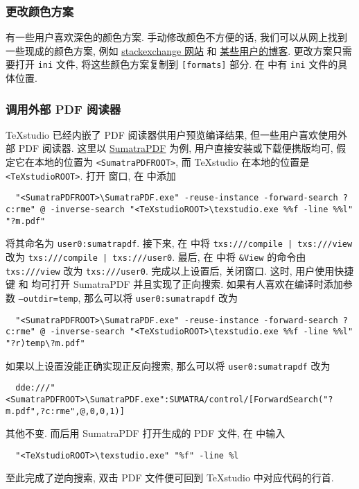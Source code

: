 \subsubsection{更改颜色方案}

有一些用户喜欢深色的颜色方案.
手动修改颜色不方便的话, 我们可以从网上找到一些现成的颜色方案,
例如
\href{https://tex.stackexchange.com/questions/108315/how-can-i-set-a-dark-theme-in-texstudio}{stackexchange 网站}%
和%
\href{https://robjhyndman.com/hyndsight/dark-themes-for-writing/}{某些用户的博客}.
更改方案只需要打开 \texttt{ini} 文件,
将这些颜色方案复制到 \texttt{[formats]} 部分.
在 
中有 \texttt{ini} 文件的具体位置.

\subsubsection{调用外部 PDF 阅读器}

\TeX studio 已经内嵌了 PDF 阅读器供用户预览编译结果,
但一些用户喜欢使用外部 PDF 阅读器.
这里以 \href{https://www.sumatrapdfreader.org/free-pdf-reader.html}{SumatraPDF} 为例,
用户直接安装或下载便携版均可,
假定它在本地的位置为 \texttt{<SumatraPDFROOT>},
而 \TeX studio 在本地的位置是 \texttt{<TeXstudioROOT>}.
打开  窗口,
在  中添加
\begin{lstlisting}
  "<SumatraPDFROOT>\SumatraPDF.exe" -reuse-instance -forward-search ?c:rme" @ -inverse-search "<TeXstudioROOT>\texstudio.exe %%f -line %%l" "?m.pdf"
\end{lstlisting}
将其命名为 \texttt{user0:sumatrapdf}.
接下来, 在  中将
\texttt{txs:///compile | txs:///view} 改为
\texttt{txs:///compile | txs:///user0}.
最后, 在  中将 \texttt{\&View} 的命令由
\texttt{txs:///view} 改为 \texttt{txs:///user0}.
完成以上设置后,
关闭窗口.
这时,
用户使用快捷键  和  均可打开 SumatraPDF 并且实现了正向搜索.
如果有人喜欢在编译时添加参数 \texttt{--outdir=temp},
那么可以将 \texttt{user0:sumatrapdf} 改为
\begin{lstlisting}
  "<SumatraPDFROOT>\SumatraPDF.exe" -reuse-instance -forward-search ?c:rme" @ -inverse-search "<TeXstudioROOT>\texstudio.exe %%f -line %%l" "?r)temp\?m.pdf"
\end{lstlisting}

如果以上设置没能正确实现正反向搜索,
那么可以将 \texttt{user0:sumatrapdf} 改为
\begin{lstlisting}
  dde:///"<SumatraPDFROOT>\SumatraPDF.exe":SUMATRA/control/[ForwardSearch("?m.pdf",?c:rme",@,0,0,1)]
\end{lstlisting}
其他不变.
而后用 SumatraPDF 打开生成的 PDF 文件,
在  中输入
\begin{lstlisting}
  "<TeXstudioROOT>\texstudio.exe" "%f" -line %l
\end{lstlisting}
至此完成了逆向搜索,
双击 PDF 文件便可回到 \TeX studio 中对应代码的行首.


